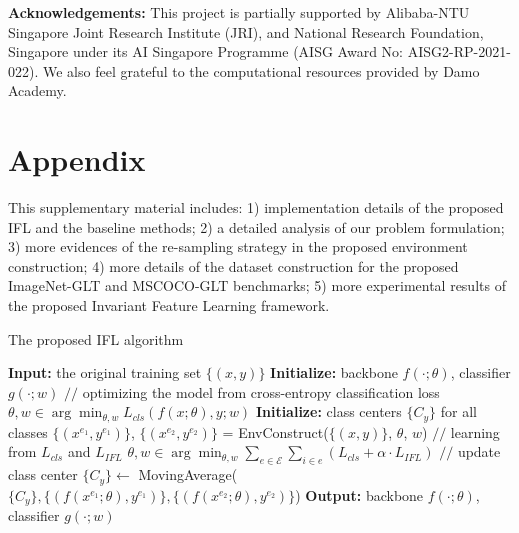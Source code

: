 \documentclass{article}
\begin{document}
 
\noindent\textbf{Acknowledgements:} This project is partially supported by Alibaba-NTU Singapore Joint Research Institute (JRI), and National Research Foundation, Singapore under its AI Singapore Programme (AISG Award No: AISG2-RP-2021-022). We also feel grateful to the computational resources provided by Damo Academy.




\appendix



\section{Appendix} 
This supplementary material includes: 1) implementation details of the proposed IFL and the baseline methods; 2) a detailed analysis of our problem formulation; 3) more evidences of the re-sampling strategy in the proposed environment construction; 4) more details of the dataset construction for the proposed ImageNet-GLT and MSCOCO-GLT benchmarks; 5) more experimental results of the proposed Invariant Feature Learning framework.


\begin{algorithm}[H]
        \caption{The proposed IFL algorithm}
        \begin{algorithmic}
          \STATE \textbf{Input:} the original training set $\{(x,y)\}$
          \STATE \textbf{Initialize:} backbone $f(\cdot;\theta)$, classifier $g(\cdot;w)$
            \STATE $//$ optimizing the model from cross-entropy classification loss
            \STATE $\theta, w \in \arg\min_{\theta, w} L_{cls}(f(x;\theta), y;w)$
          \ENDFOR
          \STATE \textbf{Initialize:} class centers $\{C_y\}$ for all classes
          \REPEAT
          \STATE $\{(x^{e_1},y^{e_1})\}$, $\{(x^{e_2},y^{e_2})\}$ = EnvConstruct($\{(x,y)\}$, $\theta$, $w$)
             \STATE $//$ learning from $L_{cls}$ and $L_{IFL}$
             \STATE $\theta, w \in \arg\min_{\theta, w} \sum_{e\in \mathcal{E}} \sum_{i\in e} (L_{cls} + \alpha \cdot L_{IFL})$
             \STATE $//$ update class center
             \STATE $\{C_y\} \leftarrow$ MovingAverage($\{C_y\}, \{(f(x^{e_1};\theta), y^{e_1})\}, \{ (f(x^{e_2};\theta), y^{e_2}) \}$)
          \ENDFOR
          \STATE \textbf{Output: } backbone $f(\cdot;\theta)$, classifier $g(\cdot;w)$
        \end{algorithmic}
        \label{apx_alg:1}
\end{algorithm}
\end{document}
